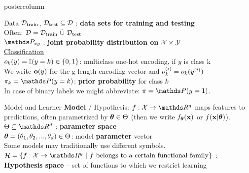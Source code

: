 \documentclass{beamer}
\begin{document}
\begin{frame}[fragile]{}
\begin{columns}
\begin{column}{.31\textwidth}
\begin{beamercolorbox}[center]{postercolumn}
\begin{minipage}{.98\textwidth}
{\begin{myblock}{Data}
$\mathcal{D}_{\text{train}}$, $\mathcal{D}_{\text{test}} \subseteq \mathcal{D}$ : \textbf{data sets for training and testing} \\ 
Often: $\mathcal{D} = \mathcal{D}_{\text{train}} ~ \dot{\cup} ~ \mathcal{D}_{\text{test}}$\\
 

$\P_{xy}$ : \textbf{joint probability distribution on} $\mathcal{X} \times \mathcal{Y}$ \\


\underline{Classification}\\

$o_k(y) = \mathbb{I}(y = k) \in \{0,1\}$: multiclass one-hot encoding, if $y$ is class k\\ 
We write $\bold{o}(y)$ for the g-length encoding vector and $o_k^{(i)} =  o_k(y^{(i)})$\\

$\pi_k = \P(y = k)$:\textbf{ prior probability} for class $k$ \\
In case of binary labels we might abbreviate: $\pi = \P(y = 1)$.
  
\end{myblock}
\begin{myblock}{Model and Learner}
    \textbf{Model} / Hypothesis: $f : \Xspace \rightarrow \R^g$ maps features to predictions, often parametrized by $\bm{\theta} \in \Theta$ (then we write $f_{\bm{\theta}}(\mathbf{x})$ or $f(\mathbf{x} | \bm{\theta})$). \\


$\Theta \subseteq \R^d$ : \textbf{parameter space} \\
  
$\bm{\theta} = (\theta_1, \theta_2, ..., \theta_d) \in \Theta$: model \textbf{parameter} vector\\
Some models may traditionally use different symbols. \\

$\Hspace = \{f : \Xspace \rightarrow \R^g ~|~ f \text{ belongs to a certain functional family}\}$ : \\ \textbf{Hypothesis space} -- set of functions to which we restrict learning
				

\end{myblock}}
\end{minipage}
\end{beamercolorbox}
\end{column}
\end{columns}
\end{frame}
\end{document}
